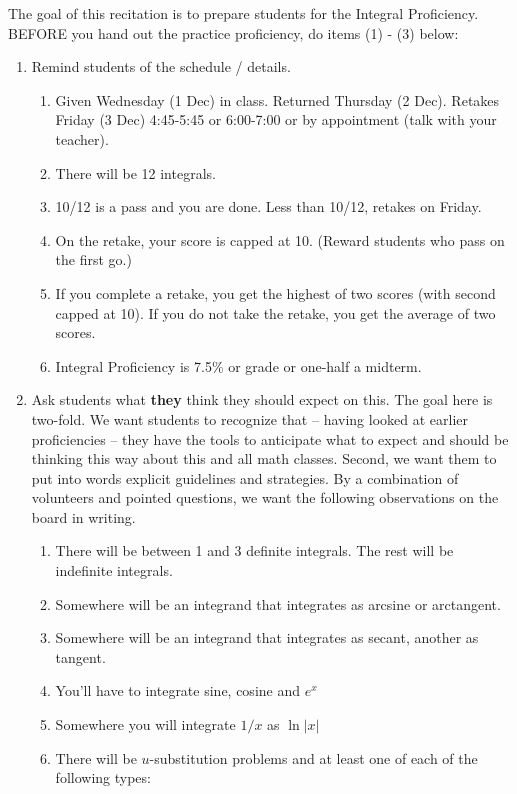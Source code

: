 \documentclass[12pt]{article}
\renewcommand{\emph}[1]{\textsf{\textbf{#1}}}
\begin{document}
The goal of this recitation is to prepare students for the Integral Proficiency.\\

BEFORE you hand out the practice proficiency, do items (1) - (3) below:\\

\begin{enumerate}
\item Remind students of the schedule / details.
	\begin{enumerate}
	\item Given Wednesday (1 Dec)  in class. Returned Thursday (2 Dec). Retakes Friday (3 Dec) 4:45-5:45 or 6:00-7:00 or by appointment (talk with your teacher).
	\item There will be 12 integrals.
	\item 10/12 is a pass and you are done. Less than 10/12, retakes on Friday. 
	\item On the retake, your score is capped at 10. (Reward students who pass on the first go.)
	\item If you complete a retake, you get the highest of two scores (with second capped at 10). If you do not take the retake, you get the average of two scores.
	\item Integral Proficiency is 7.5\% or grade or one-half a midterm.
	\end{enumerate}
\item Ask students what \emph{they} think they should expect on this. The goal here is two-fold. We want students to recognize that -- having looked at earlier proficiencies -- they have the tools to anticipate what to expect and should be thinking this way about this and all math classes. Second, we want them to put into words explicit guidelines and strategies. By a combination of volunteers and pointed questions, we want the following observations on the board in writing.
	\begin{enumerate}
	\item There will be between 1 and 3 definite integrals. The rest will be indefinite integrals.
	\item Somewhere will be an integrand that integrates as arcsine or arctangent.
	\item Somewhere will be an integrand that integrates as secant, another as tangent. 
	\item You'll have to integrate sine, cosine and $e^x$
	\item Somewhere you will integrate $1/x$ as $\ln |x|$
	\item There will be $u$-substitution problems and at least one of each of the following types:

\end{enumerate}
\end{enumerate}
\end{document}
